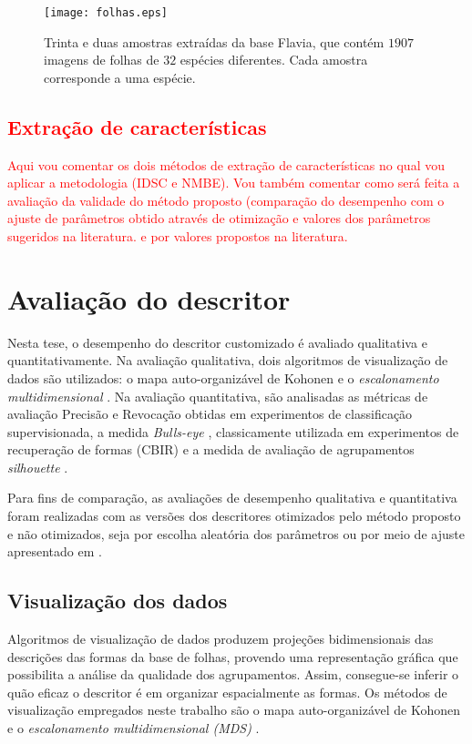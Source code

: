 \begin{figure}[!ht]
	\caption{\label{fig:leaves} Trinta e duas amostras extraídas da base Flavia, que contém $1907$ imagens de folhas de $32$ espécies diferentes. Cada amostra corresponde a uma espécie.}
	\centering
	\texttt{[image: folhas.eps]}
\end{figure}

\textcolor{red}{
\section{Extração de características\label{sec:EA}}
Aqui vou comentar os dois métodos de extração de características no qual vou aplicar a metodologia (IDSC e NMBE).
Vou também comentar como será feita a avaliação da 
validade do método proposto (comparação do desempenho com o ajuste de parâmetros obtido através de otimização e valores dos parâmetros sugeridos na literatura.
e por valores propostos na literatura.
}

\section{Avaliação do descritor}

Nesta tese, o desempenho do descritor customizado é avaliado qualitativa e quantitativamente. Na avaliação qualitativa, dois algoritmos de visualização de dados são utilizados: o mapa auto-organizável de Kohonen \cite{Kohonen:2001} e o \textit{escalonamento multidimensional} \cite{cox:2000}. Na avaliação quantitativa,  são analisadas as métricas de avaliação Precisão e Revocação \cite{Paula:2013} obtidas em experimentos de classificação supervisionada, a medida \textit{Bulls-eye} \cite{Alajlan20117,Ling:2007:SCU:1191552.1191806}, classicamente utilizada em experimentos de recuperação de formas (\ac{CBIR}) e a medida de avaliação de agrupamentos \textit{silhouette} \cite{Rousseeuw:1987}. 

Para fins de comparação,  as avaliações de desempenho qualitativa e quantitativa foram realizadas com as versões dos descritores otimizados pelo método proposto e não otimizados, seja por escolha aleatória dos parâmetros ou por meio de ajuste apresentado em \cite{Costa:1997}.

\subsection{Visualização dos dados}

Algoritmos de visualização de dados produzem projeções bidimensionais das descrições das formas da base de folhas, provendo uma representação gráfica que possibilita a análise da qualidade dos agrupamentos. Assim, consegue-se inferir o quão eficaz o descritor é em organizar espacialmente as formas. Os métodos de visualização empregados neste trabalho são o mapa auto-organizável de Kohonen \cite{Kohonen:2001} e o \textit{escalonamento multidimensional (\ac{MDS})} \cite{cox:2000}.

